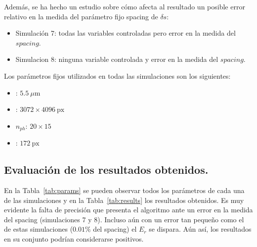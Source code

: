 \documentclass[12pt]{article}
\numberwithin{equation}{section}%
\newcommand{\lightit}[1]{{\lightitfont #1}}
\begin{document}
Además, se ha hecho un estudio sobre cómo afecta al resultado un posible error relativo en la medida del parámetro fijo \lightit{spacing} de \(\delta s\):

\begin{itemize}
    \item Simulación 7: todas las variables controladas pero error en la medida del \(spacing\).
    \item Simulacion 8: ninguna variable controlada y error en la medida del \(spacing\).
\end{itemize}

Los parámetros fijos utilizados en todas las simulaciones son los siguientes:

\begin{itemize}
    \item \text{\lightit{px}}: \(5.5\ \mu\text{m}\)
    \item \text{\lightit{sendim}}: \(3072 \times 4096\ \text{px}\)
    \item $n_{ph}$: \(20 \times 15\)
    \item \text{\lightit{spacing}}: \(172\ \text{px}\)
\end{itemize}

\subsection{Evaluación de los resultados obtenidos.}
En la Tabla\ \ref{tab:params} se pueden observar todos los parámetros de cada una de las simulaciones y en la Tabla\ \ref{tab:results} los resultados obtenidos. Es muy evidente la falta de precisión que presenta el algoritmo ante un error en la medida del \lightit{spacing} (simulaciones 7 y 8). Incluso aún con un error tan pequeño como el de estas simulaciones (\(0.01\%\) del \lightit{spacing}) el \(E_r\) se dispara. Aún así, los resultados en su conjunto podrían considerarse positivos.
\end{document}
